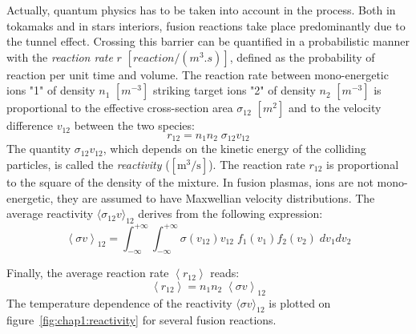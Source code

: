 Actually, quantum physics has to be taken into account in the process. Both in tokamaks and in stars interiors, fusion reactions take place predominantly due to the tunnel effect. Crossing this barrier can be quantified in a probabilistic manner with the \textit{reaction rate} $r$ $[\si{reaction/(m^3.s)}]$, defined as the probability of reaction per unit time and volume. 
The reaction rate between mono-energetic ions "1" of density $n_1$ $[\si{m}^{-3}]$ striking target ions "2" of density $n_2$ $[\si{m}^{-3}]$ is proportional to the effective cross-section area $\sigma_{12}$ $[\si{m}^2]$ and to the velocity difference $v_{12}$ between the two species:
\begin{equation*}
	r_{12} = n_1 n_2 \; \sigma_{12} v_{12}
\end{equation*}
The quantity  $\sigma_{12} v_{12}$, which depends on the kinetic energy of the colliding particles, is called the \textit{reactivity} ($\mathrm{[m^3/s]}$). The reaction rate $r_{12}$ is proportional to the square of the density of the mixture. In fusion plasmas, ions are not mono-energetic, they are assumed to have Maxwellian velocity distributions. The average reactivity $\langle \sigma_{12} v \rangle_{12}$ derives from the following expression:
\begin{equation*}
	\left < \sigma v \right >_{12} 
	= \int_{-\infty}^{+\infty} \int_{-\infty}^{+\infty} 
	\sigma(v_{12}) v_{12}\;  f_1(v_1) f_2(v_2) \; dv_1dv_2
\end{equation*}

Finally, the average reaction rate $\left < r_{12} \right >$ reads:
\begin{equation*}
	\left < r_{12} \right > = n_1 n_2 \; \left < \sigma v \right >_{12}
\end{equation*}
The temperature dependence of the reactivity $\langle \sigma v \rangle_{12}$ is plotted on figure~\ref{fig:chap1:reactivity} for several fusion reactions.

